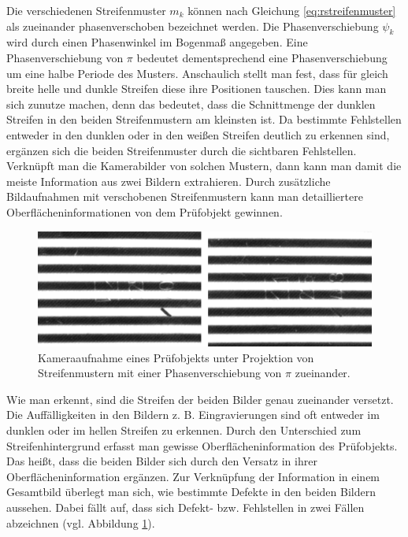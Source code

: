 \noindent
Die verschiedenen Streifenmuster $m_k$ können nach Gleichung \ref{eq:rstreifenmuster} als zueinander phasenverschoben bezeichnet werden.
Die Phasenverschiebung $\psi_k$ wird durch einen Phasenwinkel im Bogenmaß angegeben.
Eine Phasenverschiebung von $ \pi $ bedeutet dementsprechend eine Phasenverschiebung um eine halbe Periode des Musters.
Anschaulich stellt man fest, dass für gleich breite helle und dunkle Streifen diese ihre Positionen tauschen.
Dies kann man sich zunutze machen, denn das bedeutet, dass die Schnittmenge der dunklen Streifen in den beiden Streifenmustern am kleinsten ist.
Da bestimmte Fehlstellen entweder in den dunklen oder in den weißen Streifen deutlich zu erkennen sind, ergänzen sich die beiden Streifenmuster durch die sichtbaren Fehlstellen.
Verknüpft man die Kamerabilder von solchen Mustern, dann kann man damit die meiste Information aus zwei Bildern extrahieren.
Durch zusätzliche Bildaufnahmen mit verschobenen Streifenmustern kann man detailliertere Oberflächeninformationen von dem Prüfobjekt gewinnen.

\begin{figure}[H]
	\centering
	\includegraphics[width=\textwidth]{03_sichtpruefungDurchLichtstreuung/einsatzVonMehrerenStreifenmustern/figures/imageToLink}
	\caption[Zu verknüpfende Bilder]{Kameraaufnahme eines Prüfobjekts unter Projektion von Streifenmustern mit einer Phasenverschiebung von $ \pi $ zueinander.}
	\label{img:imageToLink}
\end{figure}

\noindent
Wie man erkennt, sind die Streifen der beiden Bilder genau zueinander versetzt.
Die Auffälligkeiten in den Bildern z. B. Eingravierungen sind oft entweder im dunklen oder im hellen Streifen zu erkennen.
Durch den Unterschied zum Streifenhintergrund erfasst man gewisse Oberflächeninformation des Prüfobjekts.
Das heißt, dass die beiden Bilder sich durch den Versatz in ihrer Oberflächeninformation ergänzen.
Zur Verknüpfung der Information in einem Gesamtbild überlegt man sich, wie bestimmte Defekte in den beiden Bildern aussehen.
Dabei fällt auf, dass sich Defekt- bzw. Fehlstellen in zwei Fällen abzeichnen (vgl. Abbildung \ref{img:imageToLink}).

